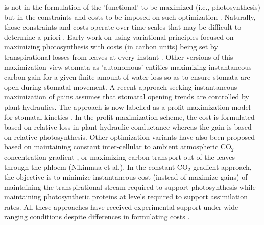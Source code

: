\documentclass[utf8]{frontiersSCNS} %
\begin{document}
is not in the formulation of the 'functional' to be maximized (i.e., photosynthesis) but in the constraints and costs to be imposed on such optimization \citep{dewar2018new}.  Naturally, those constraints and costs operate over time scales that may be difficult to determine a priori .  Early work on using variational principles focused on maximizing photosynthesis with costs (in carbon units) being set by transpirational losses from leaves at every instant \citep{cowan_stomatal_1977,cowan_stomatal_1978}.  Other versions of this maximization view stomata as 'autonomous' entities maximizing instantaneous carbon gain for a given finite amount of water loss \citep{katul_leaf_2009} so as to ensure stomata are open during stomatal movement.  A recent approach seeking instantaneous maximization of gains assumes that stomatal opening trends are controlled by plant hydraulics.  The approach is now labelled as a profit-maximization model for stomatal kinetics \citep{sperry_pragmatic_2016,sperry_predicting_2017}. In the profit-maximization scheme, the cost is formulated based on relative loss in plant hydraulic conductance whereas the gain is based on relative photosynthesis.  Other optimization variants have also been proposed based on maintaining constant inter-cellular to ambient atmospheric CO$_2$ concentration gradient \citep{prentice2014balancing}, or maximizing carbon transport out of the leaves through the phloem (Nikinmaa et al.).  In the constant CO$_2$ gradient approach, the objective is to minimize instantaneous cost (instead of maximize gains) of maintaining the transpirational stream required to support photosynthesis while maintaining photosynthetic proteins at levels required to support assimilation rates.  All these approaches have received experimental support under wide-ranging conditions despite differences in formulating costs  \citep{prentice2014balancing,sperry_predicting_2017}.
\end{document}
